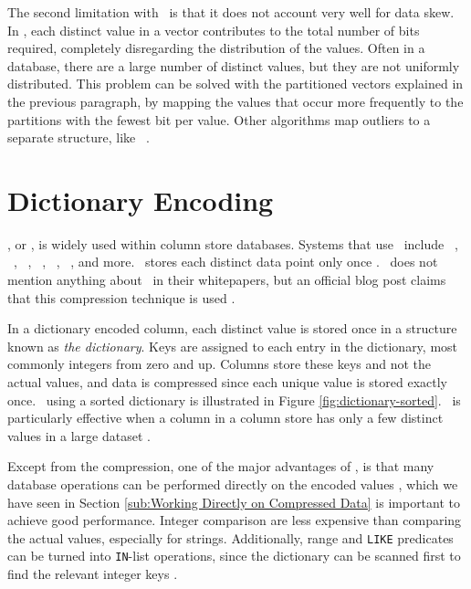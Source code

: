 The second limitation with \bp~is that it does not account very well for data skew. In \bp, each distinct value in a vector contributes to the total number of bits required, completely disregarding the distribution of the values. Often in a database, there are a large number of distinct values, but they are not uniformly distributed. This problem can be solved with the partitioned vectors explained in the previous paragraph, by mapping the values that occur more frequently to the partitions with the fewest bit per value. Other algorithms map outliers to a separate structure, like \pfdelta~\cite{Bjorklund2011-wh}.


\section{Dictionary Encoding}
\label{sec:Dictionary Encoding}
\de, or , is widely used within column store databases. Systems that use \de~include \oracle~\cite{Lahiri2015-mz}, \ibm~\cite{Raman2013-em}, \saph~\cite{Farber2012-vh}, \sapnw~\cite{Lemke2010-is}, \blink~\cite{Johnson2008-cp}, \mssql~\cite{Larson2013-mc}, and more. \qlikview~stores each distinct data point only once \cite{Qlik2011-ef}. \tableau~does not mention anything about \de~in their whitepapers, but an official blog post claims that this compression technique is used \cite{noauthor_undated-us}.


In a dictionary encoded column, each distinct value is stored once in a structure known as \textit{the dictionary}. Keys are assigned to each entry in the dictionary, most commonly integers from zero and up. Columns store these keys and not the actual values, and data is compressed since each unique value is stored exactly once. \de~using a sorted dictionary is illustrated in Figure \ref{fig:dictionary-sorted}. \de~is particularly effective when a column in a column store has only a few distinct values in a large dataset \cite{Faust2015-ke}.


Except from the compression, one of the major advantages of \de, is that many database operations can be performed directly on the encoded values \cite{Faust2015-ke}, which we have seen in Section \ref{sub:Working Directly on Compressed Data} is important to achieve good performance. Integer comparison are less expensive than comparing the actual values, especially for strings. Additionally, range and \texttt{LIKE} predicates can be turned into \texttt{IN}-list operations, since the dictionary can be scanned first to find the relevant integer keys \cite{Barber2012-xt}.

